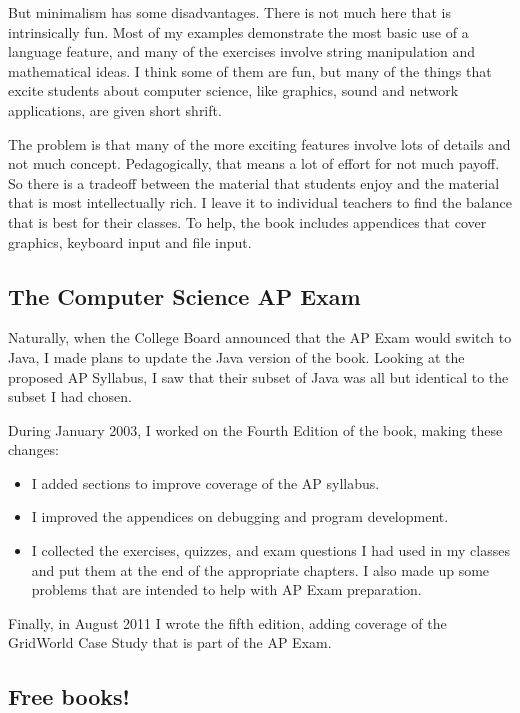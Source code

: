 But minimalism has some disadvantages.
There is not much here that is intrinsically fun.
Most of my examples demonstrate the most basic use of a language feature, and many of the exercises involve string manipulation and mathematical ideas.
I think some of them are fun, but many of the things that excite students about computer science, like graphics, sound and network applications, are given short shrift.

The problem is that many of the more exciting features involve lots of details and not much concept.
Pedagogically, that means a lot of effort for not much payoff.
So there is a tradeoff between the material that students enjoy and the material that is most intellectually rich.
I leave it to individual teachers to find the balance that is best for their classes.
To help, the book includes appendices that cover graphics, keyboard input and file input.

\subsection*{The Computer Science AP Exam}

Naturally, when the College Board announced that the AP Exam
would switch to Java, I made plans to update the Java version of
the book.  Looking at the proposed AP Syllabus, I saw that their
subset of Java was all but identical to the subset I had chosen.

During January 2003, I worked on the Fourth Edition of the book,
making these changes:

\begin{itemize}

\item I added sections to improve coverage of the AP syllabus.

\item I improved the appendices on debugging and program development.

\item I collected the exercises, quizzes, and exam questions I
had used in my classes and put them at the end of the appropriate
chapters.  I also made up some problems that are intended to
help with AP Exam preparation.

\end{itemize}

Finally, in August 2011 I wrote the fifth edition, adding
coverage of the GridWorld Case Study that is part of the AP Exam.

\subsection*{Free books!}

